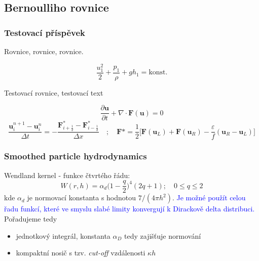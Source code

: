 \documentclass[12pt,a4paper]{article}
\newcommand{\vect}[1]{\mathbf{#1}}
\begin{document}
\thispagestyle{empty}

\noindent
\subsection*{Bernoulliho rovnice}

\subsubsection*{Testovací příspěvek}

\noindent
Rovnice, rovnice, rovnice.

\begin{equation}
	\frac{u_1^2 }{2} + \frac{p_1 }{\rho} + gh_1 = \text{konst.}
\end{equation}

\noindent
Testovací	rovnice, testovací text

\begin{equation}
\frac{\partial \vect{u}}{\partial t} + \nabla \cdot\vect{F}(\vect{u}) = 0
\end{equation}
\begin{equation}
	\frac{\vect{u}_i^{n+1}-\vect{u}_i^{n}}{\Delta t} = -\frac{\vect{F}_{i+\frac{1 }{2}}^{*}-\vect{F}_{i-\frac{1 }{2}}^{*}}{\Delta x} \quad ; \quad \vect{F}* = \frac{1}{2}\big[ \vect{F}(\vect{u}_L) + \vect{F}(\vect{u}_R) - \frac{\varepsilon }{f}(\vect{u}_R - \vect{u}_L)\big]
\end{equation}

\subsubsection*{Smoothed particle hydrodynamics}


\noindent
Wendland kernel - funkce čtvrtého řádu:
$$
	W(r,h) = \alpha_d \bigg( 1 - \frac{q}{2} \bigg)^4 (2q +1); \quad 0 \leq q \leq 2
$$
kde $ \alpha_d $ je normovací konstanta s hodnotou $ 7/(4\pi h^2) $. \textcolor{blue}{Je možné použít celou řadu funkcí, které ve smyslu slabé limity konvergují k Dirackově delta distribuci.} Pořadujeme tedy

\begin{itemize}
	\item jednotkový integrál, konstanta $ \alpha_D $ tedy zajišťuje normování
	\item kompaktní nosič s tzv. \textit{cut-off} vzdálenosti $ \kappa h $
\end{itemize}
\end{document}
